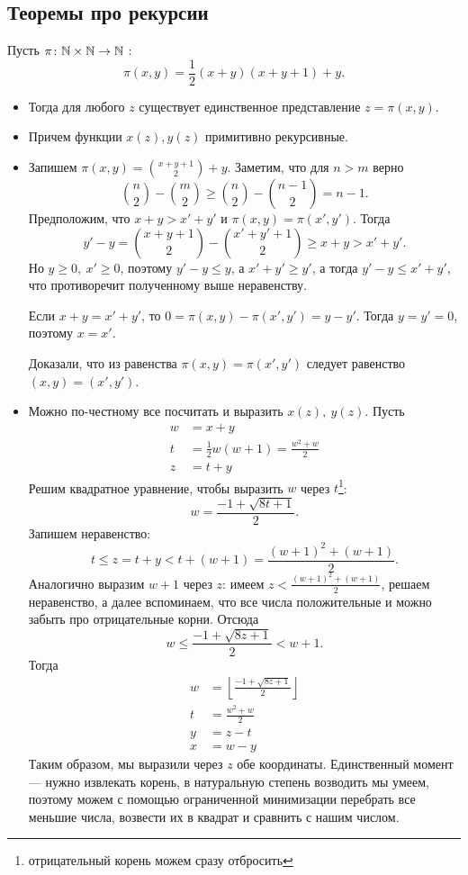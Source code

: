 \subsection{Теоремы про рекурсии}
\begin{thm}
    Пусть $ \pi\colon \mathbb{N} \times \mathbb{N} \to  \mathbb{N}$ :
	\[
		\pi(x, y) = \frac{1}{2}(x+y) (x+y+1)+y
	.\] 
	\begin{itemize}
	\item
	Тогда для любого $ z$ существует единственное представление $ z = \pi(x, y)$.
\item Причем функции $ x(z), y(z)$ примитивно рекурсивные.
	\end{itemize}
\end{thm}
\begin{proof*}
	\begin{itemize}
		\item
	Запишем $ \pi(x, y) = {{x+y+1}\choose{2}} + y$. Заметим, что для $ n > m$ верно  
	$$ {n \choose 2} - {m \choose 2} \ge {n \choose 2} - {n-1 \choose 2} = n-1.$$
	Предположим, что $ x + y >  x' + y'$ и  $ \pi(x, y) = \pi(x',y')$. Тогда
	 \[
		 y' - y = {x+y+1 \choose 2} - {x'+y'+1 \choose 2} \ge x + y > x' + y'
	.\] 
	Но $ y \ge 0, ~ x' \ge 0$,  поэтому $ y' - y \le  y$, а $ x'+y' \ge y'$, а тогда $ y' - y \le x' + y'$, что противоречит полученному выше неравенству.

	Если $ x + y = x' + y'$, то $ 0 = \pi(x, y) - \pi(x', y') = y - y'$. Тогда $ y=y'=0$, поэтому  $ x = x'$. 

	Доказали, что из равенства  $ \pi(x, y) = \pi(x', y')$ следует равенство $ (x, y)= (x', y')$.
\item  Можно по-честному все посчитать и выразить $ x(z), ~y(z)$.
	Пусть 
	\[
	\begin{aligned}
		w &= x+y \\
		t &= \frac{1}{2}w(w+1) = \frac{w^2+w}{2} \\
		z &= t +y
	\end{aligned}
	\]
	Решим квадратное уравнение, чтобы выразить $ w$ через $ t$\footnote{отрицательный корень можем сразу отбросить}:
	\[
		w = \frac{-1 + \sqrt{ 8t + 1}}{2}
	.\] 
	Запишем неравенство:
	\[
		t \le z = t + y < t + (w +1) = \frac{(w+1)^2+(w+1)}{2}
	.\] 
	Аналогично выразим $ w+1$ через $ z$: имеем $ z < \frac{(w+1)^2+(w+1)}{2}$, решаем неравенство, а далее вспоминаем, что все числа положительные и можно забыть про отрицательные корни.
	Отсюда
	\[
		w \le \frac{-1  + \sqrt{ 8z +1} }{2} < w+1
	.\] 
	Тогда 
	\[
	\begin{aligned}
		w &= \left\lfloor \frac{-1 + \sqrt{ 8z+1} }{2} \right\rfloor \\
		t &= \frac{w^2+w}{2} \\
		y &= z - t \\
		x &= w - y
	\end{aligned}
	\]
	Таким образом, мы выразили через $ z$ обе координаты. Единственный момент --- нужно извлекать корень, в натуральную степень возводить мы умеем, поэтому можем с помощью ограниченной минимизации перебрать все меньшие числа, возвести их в квадрат и сравнить с нашим числом.
	\end{itemize}
\end{proof*}


